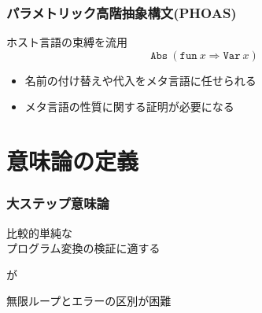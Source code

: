 \documentclass[dvipdfmx,cjk,xcolor=dvipsnames,envcountsect,notheorems,12pt]{beamer}
\theoremstyle{definition}
\begin{document}
\begin{frame}
	\frametitle{パラメトリック高階抽象構文(PHOAS)}
	\LARGE
	ホスト言語の束縛を流用
	\[\texttt{Abs}~(\texttt{fun}~x \Rightarrow \texttt{Var}~x)\]

	\begin{itemize}
		\item 名前の付け替えや代入をメタ言語に任せられる
		\item メタ言語の性質に関する証明が必要になる
	\end{itemize}
\end{frame}

\section{意味論の定義}

\begin{frame}
	\frametitle{大ステップ意味論}
	\LARGE
	\begin{center}
	比較的単純な\\プログラム変換の検証に適する

	\vfill

	が

	\vfill

	無限ループとエラーの区別が困難
	\end{center}
\end{frame}
\end{document}

